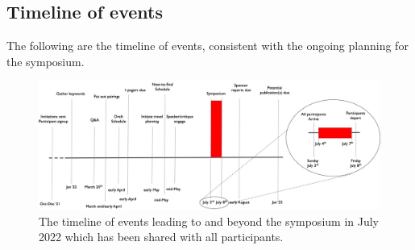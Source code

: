 \subsection{Timeline of events}

The following are the timeline of events, consistent with the ongoing
planning for the symposium.

\begin{figure}[!h]
  \centering 
  \includegraphics[scale=0.3]{fig/timeline.jpg}
  \caption{The timeline of events leading to and beyond the symposium
    in July 2022 which has been shared with all participants.}
  \label{fig:timeline}
\end{figure}
